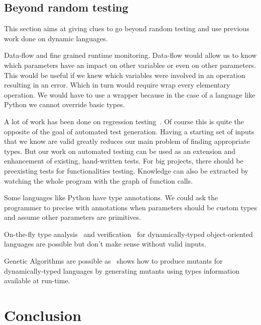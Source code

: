 \documentclass{llncs2e/llncs}
\begin{document}

\subsection{Beyond random testing}

This section aims at giving clues to go beyond random testing and use previous
work done on dynamic languages.

Data-flow and fine grained runtime monitoring. Data-flow would allow us to know
which parameters have an impact on other variables or even on other parameters.
This would be useful if we knew which variables were involved in an operation
resulting in an error. Which in turn would require wrap every elementary
operation. We would have to use a wrapper because in the case of a language like
Python we cannot override basic types.

A lot of work has been done on regression
testing~\cite{gligoric2011smutant,haupt2011type,steinert2010continuous,yoo2012regression}.
Of course this is quite the opposite of the goal of automated test generation.
Having a starting set of inputs that we know are valid greatly reduces our main
problem of finding appropriate types. But our work on automated testing can be
used as an extension and enhancement of existing, hand-written tests.
For big projects, there should be preexisting tests for functionalities testing.
Knowledge can also be extracted by watching the whole program with the graph of
function calls.

Some languages like Python have type annotations. We could ask the programmer to
precise with annotations when parameters should be custom types and assume other
parameters are primitives.

On-the-fly type analysis~\cite{chambers1991iterative} and
verification~\cite{chugh2012nested} for dynamically-typed object-oriented
languages are possible but don't make sense without valid inputs.

Genetic Algorithms are possible as~\cite{bottaci2010type} shows how to produce
mutants for dynamically-typed languages by generating mutants using types
information available at run-time.


\section{Conclusion}
\label{conclusion}
\end{document}
